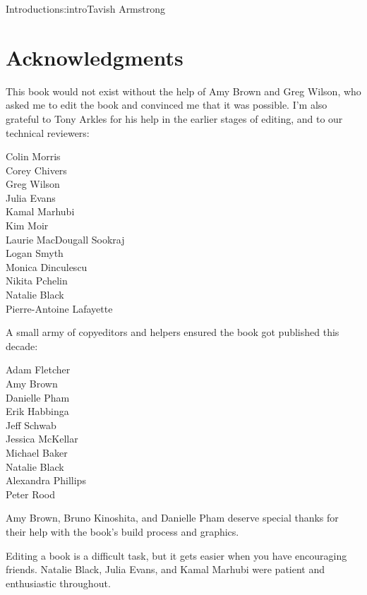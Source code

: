 \begin{aosachapter}{Introduction}{s:intro}{Tavish Armstrong}
\section*{Acknowledgments}

This book would not exist without the help of Amy Brown and Greg Wilson,
who asked me to edit the book and convinced me that it was possible.
I'm also grateful to Tony Arkles for his help in the earlier stages of editing,
and to our technical reviewers:
 
\begin{multicols}{3}
\noindent Colin Morris \\
Corey Chivers \\
Greg Wilson \\
Julia Evans \\
Kamal Marhubi \\
Kim Moir \\
Laurie MacDougall Sookraj \\
Logan Smyth \\
Monica Dinculescu \\
Nikita Pchelin \\
Natalie Black \\
Pierre-Antoine Lafayette \\
\end{multicols}

\newpage  %

\noindent A small army of copyeditors and helpers ensured the book got published this decade:

\begin{multicols}{3}
\noindent Adam Fletcher \\
Amy Brown \\
Danielle Pham \\
Erik Habbinga \\
Jeff Schwab  \\
Jessica McKellar \\
Michael Baker \\
Natalie Black \\
Alexandra Phillips \\
Peter Rood
\end{multicols}

Amy Brown, Bruno Kinoshita, and Danielle Pham deserve special thanks
for their help with the book's build process and graphics.

Editing a book is a difficult task,
but it gets easier when you have encouraging friends.
Natalie Black, Julia Evans, and Kamal Marhubi were patient and enthusiastic throughout.


\end{aosachapter}
